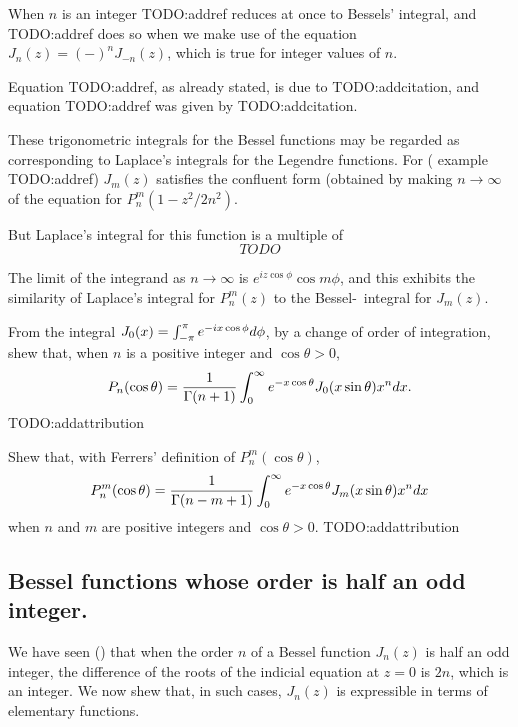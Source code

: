 \documentclass{book}
\begin{document}
When $n$ is an integer TODO:addref reduces at once to Bessels'
integral, and TODO:addref does so when we make use of the equation 
$J_n(z) = (-)^n J_{-n}(z)$, which is true for integer values of $n$.

%
%
Equation TODO:addref, as already stated, is due to TODO:addcitation,
and equation TODO:addref was given by TODO:addcitation.

These trigonometric integrals for the Bessel functions may be regarded
as corresponding to Laplace's integrals for the Legendre functions.
For ( example TODO:addref)
$J_m(z)$ satisfies the confluent form (obtained by making 
$n \rightarrow \infty$ of the equation for
$P_n^m(1-z^2/2n^2)$.

But Laplace's integral for this function is a multiple of 
$$
TODO
$$

The limit of the integrand as $n \rightarrow \infty$ is 
$e^{iz\cos\phi}\cos m\phi$, and this exhibits the similarity of
Laplace's integral for $P_n^m(z)$ to the Bessel-\Schlafli\ integral for 
$J_m(z)$.
\begin{wandwexample}
  From the integral
  $J_0(x) = \int_{-\pi}^{\pi} e^{-ix\cos\phi}d\phi$, by a
  change of order of integration, shew that, when $n$ is a positive
  integer and $\cos\theta > 0$,
  $$
  P_n(\cos\theta)
  =
  \frac{1}{\Gamma(n+1)}
  \int_0^{\infty}
  e^{-x\cos\theta}
  J_0(x\sin\theta)
  x^n
  d x.
  $$
  TODO:addattribution
\end{wandwexample}
\begin{wandwexample}
  Shew that, with Ferrers' definition of $P_n^m(\cos\theta)$,
  $$
  P_n^m(\cos\theta)
  =
  \frac{1}{\Gamma(n-m+1)}
  \int_0^{\infty}
  e^{-x\cos\theta}
  J_m(x\sin\theta)
  x^n
  d x
  $$
  when $n$ and $m$ are positive integers and
  $\cos\theta > 0$.
  TODO:addattribution
\end{wandwexample}
\subsection{Bessel functions whose order is half an odd integer.}
We have seen () that when the order $n$ of a
Bessel function $J_n(z)$ is half an odd integer, the difference of the
roots of the indicial equation at $z=0$ is $2n$, which is an integer.
We now shew that, in such cases, $J_n(z)$ is expressible in terms of
elementary functions.
\end{document}
